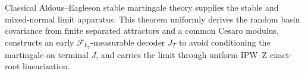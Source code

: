 Classical Aldous--Eagleson stable martingale theory supplies the stable and mixed-normal limit apparatus. This theorem uniformly derives the random basin covariance from finite separated attractors and a common Cesaro modulus, constructs an early \(\mathcal F_{k_T}\)-measurable decoder \(J_T\) to avoid conditioning the martingale on terminal \(J\), and carries the limit through uniform IPW--Z exact-root linearization.